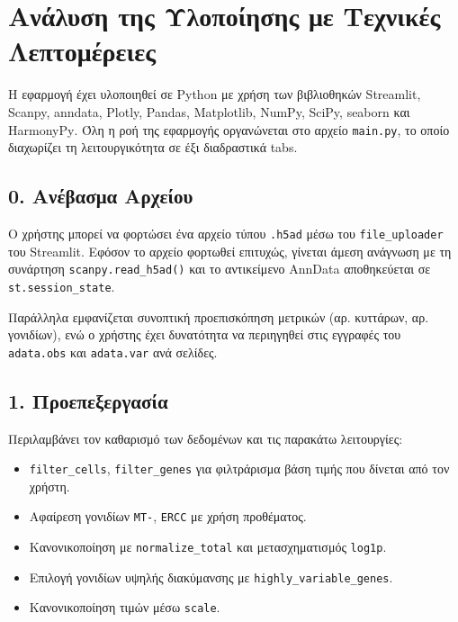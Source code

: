 \chapter{Ανάλυση της Υλοποίησης με Τεχνικές Λεπτομέρειες}

Η εφαρμογή έχει υλοποιηθεί σε \foreignlanguage{english}{Python} με χρήση των βιβλιοθηκών \foreignlanguage{english}{Streamlit, Scanpy, anndata, Plotly, Pandas, Matplotlib, NumPy, SciPy, seaborn} και \foreignlanguage{english}{HarmonyPy}. Όλη η ροή της εφαρμογής οργανώνεται στο αρχείο \foreignlanguage{english}{\texttt{main.py}}, το οποίο διαχωρίζει τη λειτουργικότητα σε έξι διαδραστικά \foreignlanguage{english}{tabs}.

\section*{0. Ανέβασμα Αρχείου}
Ο χρήστης μπορεί να φορτώσει ένα αρχείο τύπου \foreignlanguage{english}{\texttt{.h5ad}} μέσω του \foreignlanguage{english}{\texttt{file\_uploader}} του \foreignlanguage{english}{Streamlit}. Εφόσον το αρχείο φορτωθεί επιτυχώς, γίνεται άμεση ανάγνωση με τη συνάρτηση \foreignlanguage{english}{\texttt{scanpy.read\_h5ad()}} και το αντικείμενο \foreignlanguage{english}{AnnData} αποθηκεύεται σε \foreignlanguage{english}{\texttt{st.session\_state}}.

Παράλληλα εμφανίζεται συνοπτική προεπισκόπηση μετρικών (αρ. κυττάρων, αρ. γονιδίων), ενώ ο χρήστης έχει δυνατότητα να περιηγηθεί στις εγγραφές του \foreignlanguage{english}{\texttt{adata.obs}} και \foreignlanguage{english}{\texttt{adata.var}} ανά σελίδες.


\section*{1. Προεπεξεργασία}
Περιλαμβάνει τον καθαρισμό των δεδομένων και τις παρακάτω λειτουργίες:
\begin{itemize}
  \item \foreignlanguage{english}{\texttt{filter\_cells}, \texttt{filter\_genes}} για φιλτράρισμα βάση τιμής που δίνεται από τον χρήστη.
  \item Αφαίρεση γονιδίων \foreignlanguage{english}{\texttt{MT-}}, \foreignlanguage{english}{\texttt{ERCC}} με χρήση προθέματος.
  \item Κανονικοποίηση με \foreignlanguage{english}{\texttt{normalize\_total}} και μετασχηματισμός \foreignlanguage{english}{\texttt{log1p}}.
  \item Επιλογή γονιδίων υψηλής διακύμανσης με \foreignlanguage{english}{\texttt{highly\_variable\_genes}}.
  \item Κανονικοποίηση τιμών μέσω \foreignlanguage{english}{\texttt{scale}}.
\end{itemize}

